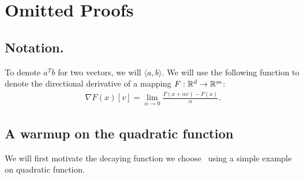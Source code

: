 \section{Omitted Proofs}


\subsection{Notation.}

To denote $a^Tb$ for two vectors, we will $\langle a, b \rangle$.
We will use the following function to denote the directional derivative of a mapping $F: \mathbb{R}^d \to \mathbb{R}^m$:
\begin{align*}
    \nabla F(x)[v] = \lim_{\alpha \to 0} \frac{F(x + \alpha v) - F(x)} {\alpha}.
\end{align*}





\subsection{A warmup on the quadratic function}
\label{app:quadratic}

We will first motivate the decaying function we choose~ using a simple example on quadratic function.

